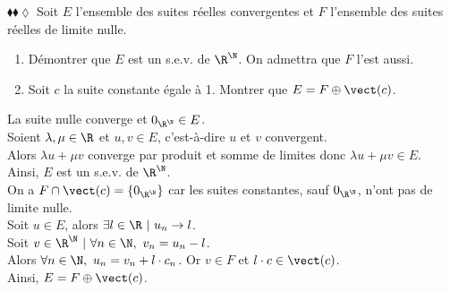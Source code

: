 \documentclass[11pt]{article}
\begin{document}
\begin{exercice}{$\blacklozenge\blacklozenge\lozenge$}{}
    Soit $E$ l'ensemble des suites réelles convergentes et $F$ l'ensemble des suites réelles de limite nulle.
    \begin{enumerate}
        \item Démontrer que $E$ est un s.e.v. de $\R^\N$. On admettra que $F$ l'est aussi.
        \item Soit $c$ la suite constante égale à 1. Montrer que $E = F \oplus \vect(c)$.
    \end{enumerate}
    \tcblower
     La suite nulle converge et $0_{\R^\N} \in E$.\\
    Soient $\lambda, \mu \in \R$ et $u, v \in E$, c'est-à-dire $u$ et $v$ convergent.\\
    Alors $\lambda u + \mu v$ converge par produit et somme de limites donc $\lambda u + \mu v \in E$.\\
    Ainsi, $E$ est un s.e.v. de $\R^\N$.\\[0.3cm]
     On a $F \cap \vect(c) = \{0_{\R^\N}\}$ car les suites constantes, sauf $0_{\R^\N}$, n'ont pas de limite nulle.\\
    Soit $u \in E$, alors $\exists l \in \R ~ | ~ u_n \to l$.\\
    Soit $v\in\R^\N ~ | ~ \forall n \in \N, ~ v_n = u_n - l$.\\
    Alors $\forall n \in \N, ~ u_n = v_n + l \cdot c_n$. Or $v \in F$ et $l \cdot c \in \vect(c)$.\\
    Ainsi, $E = F \oplus \vect(c)$.
\end{exercice}
\end{document}
